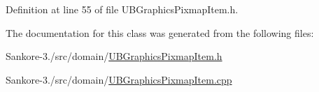 Definition at line 55 of file U\-B\-Graphics\-Pixmap\-Item.\-h.



The documentation for this class was generated from the following files\-:\begin{DoxyCompactItemize}
\item 
Sankore-\/3./src/domain/\hyperlink{_u_b_graphics_pixmap_item_8h}{U\-B\-Graphics\-Pixmap\-Item.\-h}\item 
Sankore-\/3./src/domain/\hyperlink{_u_b_graphics_pixmap_item_8cpp}{U\-B\-Graphics\-Pixmap\-Item.\-cpp}\end{DoxyCompactItemize}
